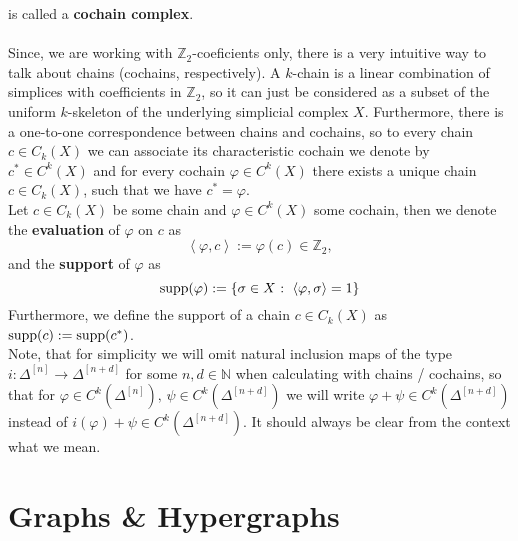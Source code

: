 is called a \textbf{cochain complex}.\\
\\
Since, we are working with \(\mathbb{Z}_2\)-coeficients only, there is a very intuitive way to talk about chains (cochains, respectively). A \(k\)-chain is a linear combination of simplices with coefficients in \(\mathbb{Z}_2\), so it can just be considered as a subset of the uniform \(k\)-skeleton of the underlying simplicial complex \(X\). Furthermore, there is a one-to-one correspondence between chains and cochains, so to every chain \(c\in C_k(X)\) we can associate its characteristic cochain we denote by \(c^*\in C^k(X)\) and for every cochain \(\varphi\in C^k(X)\) there exists a unique chain \(c\in C_k(X)\), such that we have \(c^*=\varphi\).\\
Let \(c\in C_k(X)\) be some chain and \(\varphi\in C^k(X)\) some cochain, then we denote the \textbf{evaluation} of \(\varphi\) on \(c\) as
\[
\left\langle\varphi,c\right\rangle:=\varphi(c)\in\mathbb{Z}_2,
\]
and the \textbf{support} of \(\varphi\) as
\[
\mathrm{supp}(\varphi):=\left\{\sigma\in X\text{ : }\left\langle\varphi,\sigma\right\rangle=1\right\}
\]
Furthermore, we define the support of a chain \(c\in C_k(X)\) as \(\mathrm{supp}(c):=\mathrm{supp}(c^*)\).\\
Note, that for simplicity we will omit natural inclusion maps of the type\\
\(i:\Delta^{[n]}\longrightarrow\Delta^{[n+d]}\) for some \(n,d\in\mathbb{N}\) when calculating with chains / cochains, so that for \(\varphi\in C^k(\Delta^{[n]})\text{, }\psi\in C^k(\Delta^{[n+d]})\) we will write \(\varphi+\psi\in C^k(\Delta^{[n+d]})\) instead of \(i(\varphi)+\psi\in C^k(\Delta^{[n+d]})\). It should always be clear from the context what we mean.


\section*{Graphs \& Hypergraphs}

